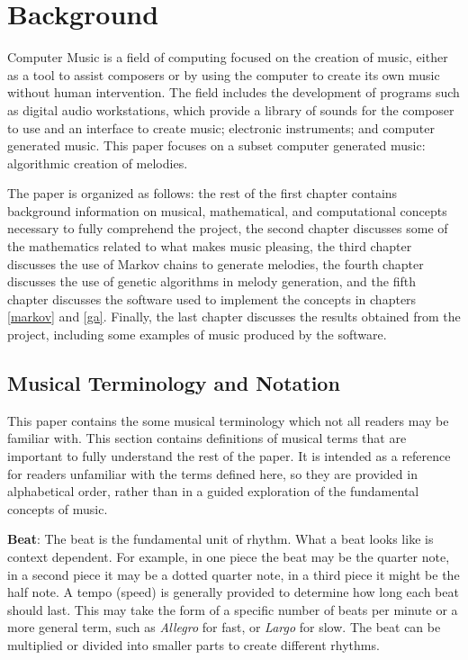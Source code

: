 \chapter{Background} \label{bg}

Computer Music is a field of computing focused on the creation of music, either as a tool to assist composers or by using the computer to create its own music without human intervention.
The field includes the development of programs such as digital audio workstations, which provide a library of sounds for the composer to use and an interface to create music; electronic instruments; and computer generated music.
This paper focuses on a subset computer generated music: algorithmic creation of melodies.

The paper is organized as follows:
the rest of the first chapter contains background information on musical, mathematical, and computational concepts necessary to fully comprehend the project,
the second chapter discusses some of the mathematics related to what makes music pleasing,
the third chapter discusses the use of Markov chains to generate melodies,
the fourth chapter discusses the use of genetic algorithms in melody generation,
and the fifth chapter discusses the software used to implement the concepts in chapters \ref{markov} and \ref{ga}.
Finally, the last chapter discusses the results obtained from the project, including some examples of music produced by the software.

\section{Musical Terminology and Notation} \label{bg:musicTerminology}

This paper contains the some musical terminology which not all readers may be familiar with.
This section contains definitions of musical terms that are important to fully understand the rest of the paper.
It is intended as a reference for readers unfamiliar with the terms defined here, so they are provided in alphabetical order, rather than in a guided exploration of the fundamental concepts of music.

\textbf{Beat}: The beat is the fundamental unit of rhythm.
What a beat looks like is context dependent.
For example, in one piece the beat may be the quarter note, in a second piece it may be a dotted quarter note, in a third piece it might be the half note.
A tempo (speed) is generally provided to determine how long each beat should last.
This may take the form of a specific number of beats per minute or a more general term, such as \textit{Allegro} for fast, or \textit{Largo} for slow.
The beat can be multiplied or divided into smaller parts to create different rhythms.

